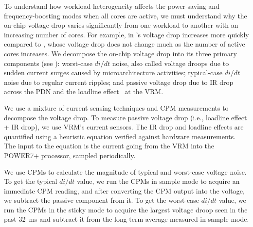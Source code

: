 To understand how workload heterogeneity affects the power-saving and frequency-boosting modes when all cores are active, we must understand why the on-chip voltage drop varies significantly from one workload to another with an increasing number of cores. For example, in  's voltage drop increases more quickly compared to , whose voltage drop does not change much as the number of active cores increases.  We decompose the on-chip voltage drop into its three primary components (see ): worst-case $di/dt$ noise, also called voltage droops due to sudden current surges caused by microarchitecture activities; typical-case $di/dt$ noise due to regular current ripples; and passive voltage drop due to IR drop across the PDN and the loadline effect~\cite{lefurgy2011active} at the VRM.

We use a mixture of current sensing techniques and CPM measurements to decompose the voltage drop. To measure passive voltage drop (i.e., loadline effect + IR drop), we use VRM's current sensors. The IR drop and loadline effects are quantified using a heuristic equation verified against hardware measurements. The input to the equation is the current going from the VRM into the POWER7+ processor, sampled periodically.

We use CPMs to calculate the magnitude of typical and worst-case voltage noise. To get the typical $di/dt$ value, we run the CPMs in sample mode to acquire an immediate CPM reading, and after converting the CPM output into the voltage, we subtract the passive component from it. To get the worst-case $di/dt$ value, we run the CPMs in the sticky mode to acquire the largest voltage droop seen in the past 32~ms and subtract it from the long-term average measured in sample mode. 

